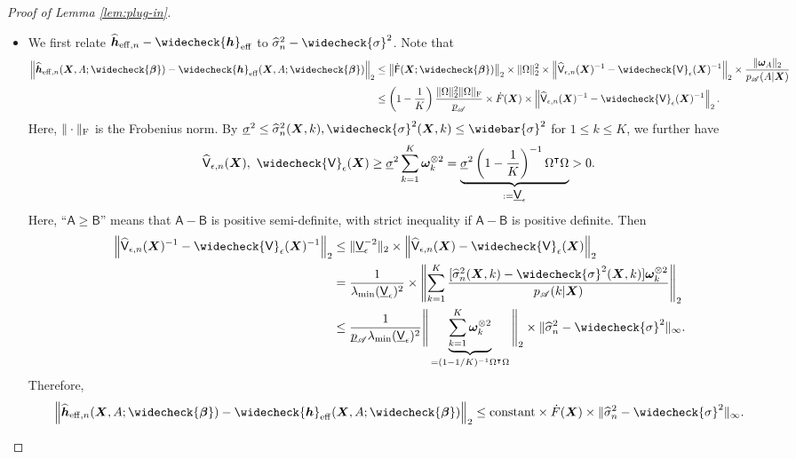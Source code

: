 \documentclass[11pt]{article}
\numberwithin{equation}{section}
\theoremstyle{definition}
\theoremstyle{remark}
\newcommand{\bh}{\bm{h}}
\newcommand{\bX}{\bm{X}}
\newcommand{\bbeta}{\bm{\beta}}
\newcommand{\bomega}{\bm{\omega}}
\newcommand{\sA}{\mathscr{A}}
\newcommand{\sfA}{\mathsf{A}}
\newcommand{\sfB}{\mathsf{B}}
\newcommand{\sfF}{\mathsf{F}}
\newcommand{\sfV}{\mathsf{V}}
\def\ubar#1{\underbar{$ #1 $}}
\newcommand{\eff}{\mathrm{eff}}
\begin{document}
\begin{proof}[Proof of Lemma \ref{lem:plug-in}]
	\begin{itemize}[leftmargin=*]
		\item We first relate $ \widehat{\bh}_{\eff,n} - \widecheck{\bh}_{\eff} $ to $ \widehat{\sigma}_{n}^{2} - \widecheck{\sigma}^{2} $. Note that 
		\begin{align*}
			\left\| \widehat{\bh}_{\eff,n}(\bX,A;\widecheck{\bbeta}) - \widecheck{\bh}_{\eff}(\bX,A;\widecheck{\bbeta}) \right\|_{2} &\le \left \| \dot{\sfF}(\bX;\widecheck{\bbeta}) \right \|_{2} \times \| \Omega \|_{2}^{2} \times \left \| \widehat{\sfV}_{\epsilon,n}(\bX)^{-1} - \widecheck{\sfV}_{\epsilon}(\bX)^{-1} \right \|_{2} \times {\|\bomega_{A}\|_{2} \over p_{\sA}(A|\bX)}\\
			&\le \left( 1 - {1 \over K} \right){\| \Omega \|_{2}^{2} \|\Omega\|_{\rm F} \over \ubar{p}_{\sA}} \times \dot{F}(\bX) \times \left \| \widehat{\sfV}_{\epsilon,n}(\bX)^{-1} - \widecheck{\sfV}_{\epsilon}(\bX)^{-1} \right \|_{2}.
		\end{align*}
		Here, $ \| \cdot \|_{\rm F} $ is the Frobenius norm. By $ \ubar{\sigma}^{2}\le \widehat{\sigma}_{n}^{2}(\bX,k),\widecheck{\sigma}^{2}(\bX,k) \le \widebar{\sigma}^{2} $ for $ 1 \le k \le K $, we further have
		\[ \widehat{\sfV}_{\epsilon,n}(\bX), ~ \widecheck{\sfV}_{\epsilon}(\bX) \ge \ubar{\sigma}^{2}\sum_{k=1}^{K}\bomega_{k}^{\otimes 2} = \underbrace{\ubar{\sigma}^{2}\left( 1 - {1 \over K} \right)^{-1}\Omega^{\intercal}\Omega}_{:= \ubar{\sfV}_{\epsilon}} > 0. \]
		Here, ``$ \sfA \ge \sfB $'' means that $ \sfA - \sfB $ is positive semi-definite, with strict inequality if $ \sfA - \sfB $ is positive definite. Then
		\begin{align}
			\left\|  \widehat{\sfV}_{\epsilon,n}(\bX)^{-1}-\widecheck{\sfV}_{\epsilon}(\bX)^{-1} \right\|_{2} &\le \| \ubar{\sfV}_{\epsilon}^{-2} \|_{2} \times \left\|  \widehat{\sfV}_{\epsilon,n}(\bX)-\widecheck{\sfV}_{\epsilon}(\bX) \right\|_{2} \nonumber \\
			&= {1 \over \lambda_{\min}(\ubar{\sfV}_{\epsilon})^{2}} \times \left\| \sum_{k=1}^{K}{[\widehat{\sigma}_{n}^{2}(\bX,k) - \widecheck{\sigma}^{2}(\bX,k)]\bomega_{k}^{\otimes 2} \over p_{\sA}(k|\bX)} \right\|_{2} \nonumber \\
			&\le {1 \over \ubar{p}_{\sA}\lambda_{\min}(\ubar{\sfV}_{\epsilon})^{2}} \Bigg\|\underbrace{\sum_{k=1}^{K}\bomega_{k}^{\otimes 2}}_{= (1-1/K)^{-1}\Omega^{\intercal}\Omega}\Bigg\|_{2} \times \| \widehat{\sigma}_{n}^{2} - \widecheck{\sigma}^{2} \|_{\infty}. \label{eq:var_bdd}
		\end{align}
		Therefore,
		\[ \left\| \widehat{\bh}_{\eff,n}(\bX,A;\widecheck{\bbeta}) - \widecheck{\bh}_{\eff}(\bX,A;\widecheck{\bbeta}) \right\|_{2} \le \text{constant} \times \dot{F}(\bX) \times \| \widehat{\sigma}_{n}^{2} - \widecheck{\sigma}^{2} \|_{\infty}. \]
		

\end{itemize}
\end{proof}
\end{document}
